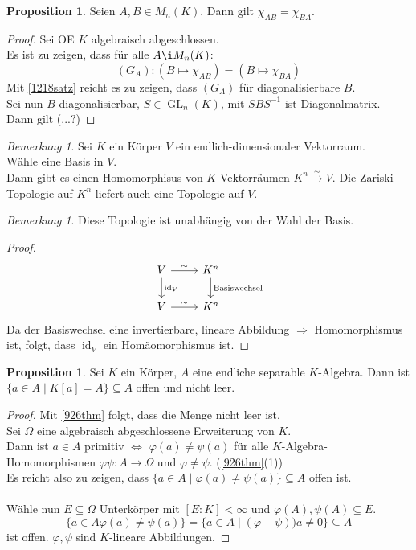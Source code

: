 \documentclass[10pt,a4paper]{article}
\newcommand{\isomfunc}{\ensuremath{\xrightarrow{\sim}}}
\newcommand{\id}{\operatorname{id}}
\newcounter{thm}[section]
\theoremstyle{definition}
\newtheorem{prop}[thm]{Proposition}
\theoremstyle{plain}
\theoremstyle{remark}
\newtheorem{bem}[thm]{Bemerkung}
\newtheorem*{bem*}{Bemerkung}
\begin{document}
\begin{prop}\label{1220prop}
	Seien $A,B\in M_n(K)$. Dann gilt $\chi_{AB}=\chi_{BA}$.
\end{prop}
\begin{proof}
	Sei OE $K$ algebraisch abgeschlossen.\\
	Es ist zu zeigen, dass für alle $A\i M_n(K)$:
	\[(G_A):(B\mapsto\chi_{AB})=(B\mapsto\chi_{BA})\]
	Mit \ref{1218satz} reicht es zu zeigen, dass $(G_A)$ für diagonalisierbare $B$.\\
	Sei nun $B$ diagonalisierbar, $S\in\operatorname{GL}_n(K)$, mit $SBS^{-1}$ ist Diagonalmatrix.\\
	Dann gilt (...?)
\end{proof}

\begin{bem}
	Sei $K$ ein Körper $V$ ein endlich-dimensionaler Vektorraum.\\
	Wähle eine Basis in $V$. \\
	Dann gibt es einen Homomorphisus von $K$-Vektorräumen $K^n\isomfunc V$. Die Zariski-Topologie auf $K^n$ liefert auch eine Topologie auf $V$.
\end{bem}
\begin{bem*}
	Diese Topologie ist unabhängig von der Wahl der Basis.
\end{bem*}
\begin{proof}
\[\begin{tikzcd}
		V \ar[r,"\sim"] \ar[d,"\id_V"] & K^n \ar[d,"\text{Basiswechsel}"]\\
		V \ar[r,"\sim"] & K^n
	\end{tikzcd}\]
	Da der Basiswechsel eine invertierbare, lineare Abbildung $\Rightarrow$ Homomorphismus ist, folgt, dass $\id_V$ ein Homäomorphismus ist.
\end{proof}

\begin{prop}
	Sei $K$ ein Körper, $A$ eine endliche separable $K$-Algebra. Dann ist $\{a\in A\mid K[a]=A\}\subseteq A$ offen und nicht leer.
\end{prop}
\begin{proof}
	Mit \ref{926thm} folgt, dass die Menge nicht leer ist.\\
	Sei $\Omega$ eine algebraisch abgeschlossene Erweiterung von $K$.\\
	Dann ist $a\in A$ primitiv $\Leftrightarrow$ $\varphi(a)\neq\psi(a)$ für alle $K$-Algebra-Homomorphismen $\varphi\psi:A\to\Omega$ und $\varphi\neq\psi$. (\ref{926thm}(1))\\
	Es reicht also zu zeigen, dass $\{a\in A\mid\varphi(a)\neq\psi(a)\}\subseteq A$ offen ist.\\
	\\
	Wähle nun $E\subseteq\Omega$ Unterkörper mit $[E:K]<\infty$ und $\varphi(A),\psi(A)\subseteq E$.\\
	\[\{a\in A\varphi(a)\neq\psi(a)\}=\{a\in A\mid(\varphi-\psi))a\neq 0\}\subseteq A\]
	ist offen. $\varphi,\psi$ sind $K$-lineare Abbildungen.
\end{proof}
\end{document}
